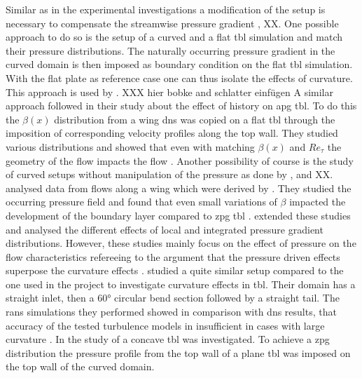Similar as in the experimental investigations a modification of the setup is necessary to compensate the streamwise pressure gradient \citet{appelbaum_systematic_2025}, XX. 
One possible approach to do so is the setup of a curved and a flat \acrshort{tbl} simulation and match their pressure distributions.
The naturally occurring pressure gradient in the curved domain is then imposed as boundary condition on the flat \acrshort{tbl} simulation.
With the flat plate as reference case one can thus isolate the effects of curvature.
This approach is used by \citet{spalart_direct_2024,pargal_adverse-pressure-gradient_2022}.
XXX hier bobke and schlatter einfügen
A similar approach \citet{bobke_history_2017} followed in their study about the effect of history on \acrshort{apg} \acrshort{tbl}.
To do this the $\beta(x)$ distribution from a wing \acrshort{dns} was copied on a flat \acrshort{tbl} through the imposition of corresponding velocity profiles along the top wall.
They studied various distributions and showed that even with matching $\beta(x)$ and $Re_{\tau}$ the geometry of the flow impacts the flow \citep{bobke_history_2017}.
Another possibility of course is the study of curved setups without manipulation of the pressure as done by \citet{vinuesa_pressure-gradient_2017,tanarro_effect_2020}, and XX.
\citet{vinuesa_pressure-gradient_2017} analysed data from flows along a wing which were derived by \citet{hosseini_direct_2016}.
They studied the occurring pressure field and found that even small variations of $\beta$ impacted the development of the boundary layer compared to \acrshort{zpg} \acrshort{tbl} \citet{vinuesa_pressure-gradient_2017}.
\citet{tanarro_effect_2020} extended these studies and analysed the different effects of local and integrated pressure gradient distributions.
However, these studies mainly focus on the effect of pressure on the flow characteristics refereeing to the argument that the pressure driven effects superpose the curvature effects \citep{patel_longitudinal_1997}.
\citet{yang_assessment_2016} studied a quite similar setup compared to the one used in the project to investigate curvature effects in \acrshort{tbl}. 
Their domain has a straight inlet, then a 60° circular bend section followed by a straight tail.
The \acrshort{rans} simulations they performed showed in comparison with \acrshort{dns} results, that accuracy of the tested turbulence models in insufficient in cases with large curvature \citep{yang_assessment_2016}.
In the study of \citep{appelbaum_systematic_2025} a concave \acrshort{tbl} was investigated. 
To achieve a \acrshort{zpg} distribution the pressure profile from the top wall of a plane \acrshort{tbl} was imposed on the top wall of the curved domain.

